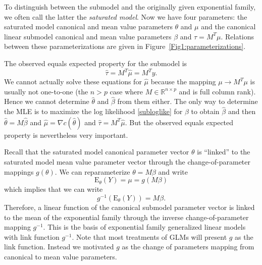 \documentclass[12pt]{article}
\newcommand{\R}{\mathbb{R}}
\newcommand{\E}{\mathrm{E}}
\DeclareMathOperator{\E}{E}
\begin{document}
To distinguish between the submodel and the originally given exponential family, we often call the latter the \emph{saturated model}. Now we have four parameters: the saturated model canonical and mean value parameters $\theta$ and $\mu$ and the canonical linear submodel canonical and mean value parameters $\beta$ and $\tau = M^T\mu$. Relations between these parameterizations are given in Figure~\ref{Fig1:parameterizations}. 

The observed equals expected property for the submodel is
\begin{equation} \label{submodelmvp}
	\hat\tau = M^T\hat\mu = M^Ty.
\end{equation}
We cannot actually solve these equations for $\hat\mu$ because the mapping $\mu \to M^T\mu$ is usually not one-to-one (the $n > p$ case where $M \in \R^{n \times p}$ and is full column rank). Hence we cannot determine $\hat\theta$ and $\hat\beta$ from them either. The only way to determine the MLE is to maximize the log likelihood \eqref{subloglike} for $\beta$ to obtain $\hat\beta$ and then $\hat\theta = M\hat\beta$ and $\hat\mu = \nabla c(\hat\theta)$ and $\hat\tau = M^T\hat\mu$. But the observed equals expected property is nevertheless very important. %

\vspace{0.5cm}

\vspace{0.5cm}Recall that the saturated model canonical parameter vector $\theta$ is ``linked'' to the saturated model mean value parameter vector through the change-of-parameter mappings $g(\theta)$. We can reparameterize $\theta = M\beta$ and write
$$
 \E_\theta(Y) = \mu = g(M\beta) 
$$
which implies that we can write
$$
  g^{-1}\left(\E_\theta(Y)\right) = M\beta.
$$
Therefore, a linear function of the canonical submodel parameter vector is linked to the mean of the exponential family through the inverse change-of-parameter mapping $g^{-1}$. This is the basis of exponential family generalized linear models with link function $g^{-1}$. Note that most treatments of GLMs will present $g$ as the link function. Instead we motivated $g$ as the change of parameters mapping from canonical to mean value parameters. 


\end{document}
